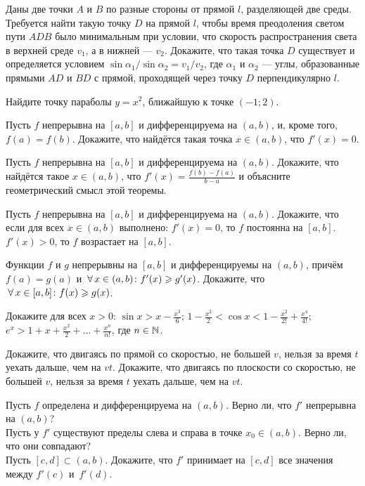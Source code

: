 \documentclass[a4paper,12pt]{article}
\begin{document}
Даны две точки $A$ и $B$ по разные стороны от прямой $l$, разделяющей
две среды. Требуется найти такую точку $D$ на прямой $l$,
чтобы время преодоления
светом пути $ADB$ было минимальным при условии, что скорость распространения
света в верхней среде $v_1$, а в нижней --- $v_2$.
Докажите, что такая точка $D$ существует и определяется условием
$\sin\alpha_1/\sin\alpha_2=v_1/v_2$, где $\alpha_1$ и $\alpha_2$ ---
углы, образованные прямыми $AD$ и $BD$ с прямой, проходящей через точку
$D$ перпендикулярно $l$.

Найдите точку параболы $y=x^2$, ближайшую к точке $(-1;2)$.


Пусть $f$ непрерывна на $[a,b]$  и дифференцируема на $(a,b)$,
и, кроме того, $f(a)=f(b)$. Докажите, что найдётся такая точка $x\in
(a,b)$, что $f'(x)=0$.

  
Пусть $f$ непрерывна на $[a,b]$  и дифференцируема на $(a,b)$.
Докажите, что найдётся такое $x\in (a,b)$, что
$f'(x)=\frac{f(b)-f(a)}{b-a}$ и
объясните геометрический смысл этой теоремы. %

Пусть $f$ непрерывна на $[a,b]$  и дифференцируема на $(a,b)$.
Докажите, что если для всех $x\in (a,b)$ выполнено:
 $f'(x)=0$, то $f$ постоянна
на $[a,b]$.
 $f'(x)>0$,
то $f$ возрастает на $[a,b]$.

Функции $f$ и $g$ непрерывны на $[a,b]$ и дифференцируемы на $(a,b)$, причём $f(a) = g(a)$ и $\,\forall\, x \in (a,b) \colon f'(x) \geqslant g'(x)$. Докажите, что $\,\forall\, x \in [a,b] \colon f(x) \geqslant g(x)$.

 Докажите для всех $x>0$: %
 $\sin x>x-\frac{x^3}{6}$;
 $1-\frac{x^2}{2}<\cos x<1-\frac{x^2}{2!}+\frac{x^4}{4!}$;\\
 $e^x>1+x+\frac{x^2}{2}+\ldots +\frac{x^n}{n!}$, где $n\in \mathbb{N}$.

Докажите, что двигаясь по прямой со скоростью, не большей $v$, нельзя за время $t$ уехать дальше, чем на $vt$.
Докажите, что двигаясь по плоскости со скоростью, не большей $v$, нельзя за время $t$ уехать дальше, чем на $vt$.


 Пусть %
$f$ определена и дифференцируема на $(a,b)$.
 Верно ли, что $f'$ непрерывна на $(a,b)$?\\
 Пусть у $f'$ существуют пределы слева и справа в точке $x_0\in(a,b)$.
Верно ли, что они совпадают?\\
Пусть $[c,d]\subset(a,b)$.
Докажите, что $f'$  принимает на $[c,d]$ все значения между
$f'(c)$ и~$f'(d)$.
\end{document}
